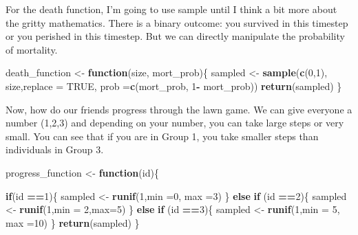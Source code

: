 \documentclass[
]{article}
\newenvironment{Shaded}{\begin{snugshade}}{\end{snugshade}}
\newcommand{\AttributeTok}[1]{\textcolor[rgb]{0.13,0.29,0.53}{#1}}
\newcommand{\ConstantTok}[1]{\textcolor[rgb]{0.56,0.35,0.01}{#1}}
\newcommand{\ControlFlowTok}[1]{\textcolor[rgb]{0.13,0.29,0.53}{\textbf{#1}}}
\newcommand{\DecValTok}[1]{\textcolor[rgb]{0.00,0.00,0.81}{#1}}
\newcommand{\FunctionTok}[1]{\textcolor[rgb]{0.13,0.29,0.53}{\textbf{#1}}}
\newcommand{\NormalTok}[1]{#1}
\newcommand{\OtherTok}[1]{\textcolor[rgb]{0.56,0.35,0.01}{#1}}
\newcommand{\SpecialCharTok}[1]{\textcolor[rgb]{0.81,0.36,0.00}{\textbf{#1}}}
\begin{document}
For the death function, I'm going to use sample until I think a bit more
about the gritty mathematics. There is a binary outcome: you survived in
this timestep or you perished in this timestep. But we can directly
manipulate the probability of mortality.

\begin{Shaded}
\begin{Highlighting}[]
\NormalTok{death\_function }\OtherTok{\textless{}{-}} \ControlFlowTok{function}\NormalTok{(size, mort\_prob)\{}
\NormalTok{  sampled }\OtherTok{\textless{}{-}} \FunctionTok{sample}\NormalTok{(}\FunctionTok{c}\NormalTok{(}\DecValTok{0}\NormalTok{,}\DecValTok{1}\NormalTok{), size,}\AttributeTok{replace =} \ConstantTok{TRUE}\NormalTok{, }\AttributeTok{prob =}\FunctionTok{c}\NormalTok{(mort\_prob, }\DecValTok{1}\SpecialCharTok{{-}}\NormalTok{ mort\_prob))}
  \FunctionTok{return}\NormalTok{(sampled)}
\NormalTok{\}}
\end{Highlighting}
\end{Shaded}

Now, how do our friends progress through the lawn game. We can give
everyone a number (1,2,3) and depending on your number, you can take
large steps or very small. You can see that if you are in Group 1, you
take smaller steps than individuals in Group 3.

\begin{Shaded}
\begin{Highlighting}[]
\NormalTok{progress\_function }\OtherTok{\textless{}{-}} \ControlFlowTok{function}\NormalTok{(id)\{}
  
  \ControlFlowTok{if}\NormalTok{(id }\SpecialCharTok{==}\DecValTok{1}\NormalTok{)\{}
\NormalTok{  sampled }\OtherTok{\textless{}{-}} \FunctionTok{runif}\NormalTok{(}\DecValTok{1}\NormalTok{,}\AttributeTok{min =}\DecValTok{0}\NormalTok{, }\AttributeTok{max =}\DecValTok{3}\NormalTok{)}
\NormalTok{  \}}
  \ControlFlowTok{else} \ControlFlowTok{if}\NormalTok{ (id }\SpecialCharTok{==}\DecValTok{2}\NormalTok{)\{}
\NormalTok{  sampled }\OtherTok{\textless{}{-}} \FunctionTok{runif}\NormalTok{(}\DecValTok{1}\NormalTok{,}\AttributeTok{min =} \DecValTok{2}\NormalTok{,}\AttributeTok{max=}\DecValTok{5}\NormalTok{)}
\NormalTok{  \}}
  \ControlFlowTok{else} \ControlFlowTok{if}\NormalTok{ (id }\SpecialCharTok{==}\DecValTok{3}\NormalTok{)\{}
\NormalTok{  sampled }\OtherTok{\textless{}{-}} \FunctionTok{runif}\NormalTok{(}\DecValTok{1}\NormalTok{,}\AttributeTok{min =} \DecValTok{5}\NormalTok{, }\AttributeTok{max =}\DecValTok{10}\NormalTok{)}
\NormalTok{  \}}
  \FunctionTok{return}\NormalTok{(sampled)}
\NormalTok{\}}
\end{Highlighting}
\end{Shaded}
\end{document}
